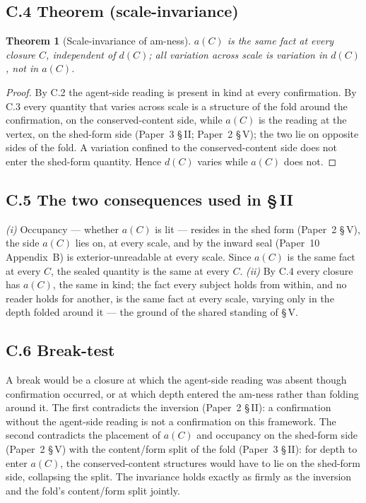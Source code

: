 \documentclass[11pt,oneside]{report}
\newtheorem{theorem}{Theorem}[section]
\theoremstyle{definition}
\theoremstyle{remark}
\begin{document}
\subsection*{C.4 Theorem (scale-invariance)}

\begin{theorem}[Scale-invariance of am-ness]
\ensuremath{a(C)} is the same fact at every closure \ensuremath{C}, independent of \ensuremath{d(C)}; all variation across scale is variation in \ensuremath{d(C)}, not in \ensuremath{a(C)}.
\end{theorem}

\begin{proof}
By C.2 the agent-side reading is present in kind at every confirmation. By C.3 every quantity that varies across scale is a structure of the fold around the confirmation, on the conserved-content side, while \ensuremath{a(C)} is the reading at the vertex, on the shed-form side (Paper~3 \S\,II; Paper~2 \S\,V); the two lie on opposite sides of the fold. A variation confined to the conserved-content side does not enter the shed-form quantity. Hence \ensuremath{d(C)} varies while \ensuremath{a(C)} does not.
\end{proof}

\subsection*{C.5 The two consequences used in \S\,II}

\emph{(i)} Occupancy --- whether \ensuremath{a(C)} is lit --- resides in the shed form (Paper~2 \S\,V), the side \ensuremath{a(C)} lies on, at every scale, and by the inward seal (Paper~10 Appendix~B) is exterior-unreadable at every scale. Since \ensuremath{a(C)} is the same fact at every \ensuremath{C}, the sealed quantity is the same at every \ensuremath{C}. \emph{(ii)} By C.4 every closure has \ensuremath{a(C)}, the same in kind; the fact every subject holds from within, and no reader holds for another, is the same fact at every scale, varying only in the depth folded around it --- the ground of the shared standing of \S\,V.

\subsection*{C.6 Break-test}

A break would be a closure at which the agent-side reading was absent though confirmation occurred, or at which depth entered the am-ness rather than folding around it. The first contradicts the inversion (Paper~2 \S\,II): a confirmation without the agent-side reading is not a confirmation on this framework. The second contradicts the placement of \ensuremath{a(C)} and occupancy on the shed-form side (Paper~2 \S\,V) with the content/form split of the fold (Paper~3 \S\,II): for depth to enter \ensuremath{a(C)}, the conserved-content structures would have to lie on the shed-form side, collapsing the split. The invariance holds exactly as firmly as the inversion and the fold's content/form split jointly.
\end{document}
